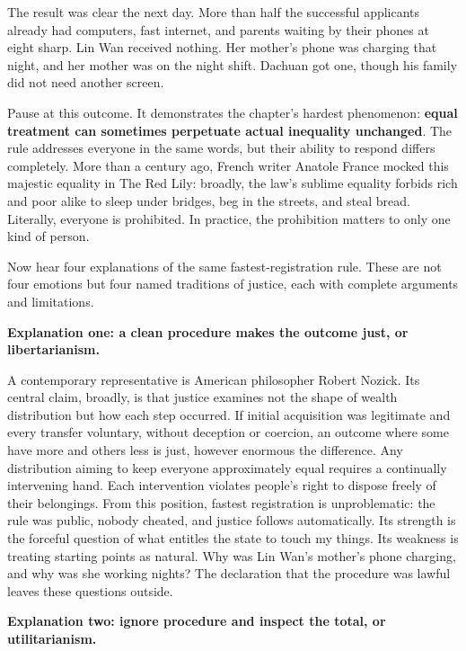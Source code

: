 The result was clear the next day. More than half the successful applicants already had computers, fast internet, and parents waiting by their phones at eight sharp. Lin Wan received nothing. Her mother's phone was charging that night, and her mother was on the night shift. Dachuan got one, though his family did not need another screen.

Pause at this outcome. It demonstrates the chapter's hardest phenomenon: \textbf{equal treatment can sometimes perpetuate actual inequality unchanged}. The rule addresses everyone in the same words, but their ability to respond differs completely. More than a century ago, French writer Anatole France mocked this majestic equality in The Red Lily: broadly, the law's sublime equality forbids rich and poor alike to sleep under bridges, beg in the streets, and steal bread. Literally, everyone is prohibited. In practice, the prohibition matters to only one kind of person.

Now hear four explanations of the same fastest-registration rule. These are not four emotions but four named traditions of justice, each with complete arguments and limitations.

\textbf{Explanation one: a clean procedure makes the outcome just, or libertarianism.}

A contemporary representative is American philosopher Robert Nozick. Its central claim, broadly, is that justice examines not the shape of wealth distribution but how each step occurred. If initial acquisition was legitimate and every transfer voluntary, without deception or coercion, an outcome where some have more and others less is just, however enormous the difference. Any distribution aiming to keep everyone approximately equal requires a continually intervening hand. Each intervention violates people's right to dispose freely of their belongings. From this position, fastest registration is unproblematic: the rule was public, nobody cheated, and justice follows automatically. Its strength is the forceful question of what entitles the state to touch my things. Its weakness is treating starting points as natural. Why was Lin Wan's mother's phone charging, and why was she working nights? The declaration that the procedure was lawful leaves these questions outside.

\textbf{Explanation two: ignore procedure and inspect the total, or utilitarianism.}

